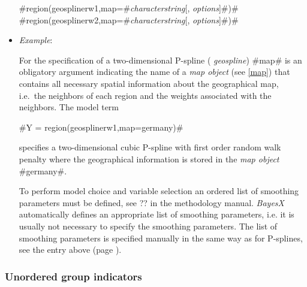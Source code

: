 \begin{itemize}
#region(geosplinerw1,map=#{\em characterstring}[, {\em options}]#)# \\
#region(geosplinerw2,map=#{\em characterstring}[, {\em options}]#)#
\item[] {\em Example}:

For the specification of a two-dimensional P-spline ({\em
geospline}) #map# is an obligatory argument indicating the name of
a {\em map object} (see \autoref{map}) that contains all necessary
spatial information about the geographical map, i.e.~the neighbors
of each region and the weights associated with the neighbors. The
model term

#Y = region(geosplinerw1,map=germany)#

specifies a two-dimensional cubic P-spline with first order random
walk penalty where the geographical information is stored in the
{\em map object} #germany#.

To perform model choice and variable selection an ordered list of smoothing parameters must be defined, see ??
in the methodology manual. {\em BayesX} automatically defines an appropriate list of smoothing parameters, i.e. it
is usually not necessary to  specify the smoothing parameters.
The list of smoothing parameters is specified manually in the same way as for P-splines,
see the entry above (page \pageref{psplines_stepwise}).
\end{itemize}

\subsubsection*{Unordered group indicators}

